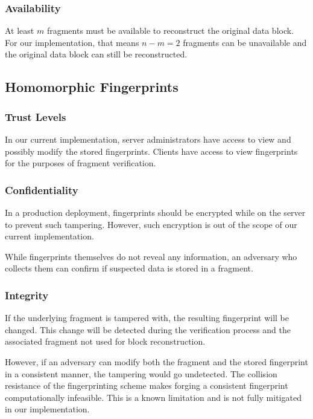 \documentclass[../veristore_security_model.tex]{subfiles}
\begin{document}
\subsubsection{Availability}
\vspace{-1.5em}
At least $m$ fragments must be available to reconstruct the original data block. For our implementation, that means $n - m = 2$ fragments can be unavailable and the original data block can still be reconstructed.

\subsection{Homomorphic Fingerprints}
\vspace{-1em}
\subsubsection{Trust Levels}
\vspace{-1.5em}

In our current implementation, server administrators have access to view and possibly modify the stored fingerprints. Clients have access to view fingerprints for the purposes of fragment verification.

\subsubsection{Confidentiality}
\vspace{-1.5em}

In a production deployment, fingerprints should be encrypted while on the server to prevent such tampering. However, such encryption is out of the scope of our current implementation.

While fingerprints themselves do not reveal any information, an adversary who collects them can confirm if suspected data is stored in a fragment.

\subsubsection{Integrity}
\vspace{-1.5em}

If the underlying fragment is tampered with, the resulting fingerprint will be changed. This change will be detected during the verification process and the associated fragment not used for block reconstruction.

However, if an adversary can modify both the fragment and the stored fingerprint in a consistent manner, the tampering would go undetected. The collision resistance of the fingerprinting scheme makes forging a consistent fingerprint computationally infeasible. This is a known limitation and is not fully mitigated in our implementation.
\end{document}
